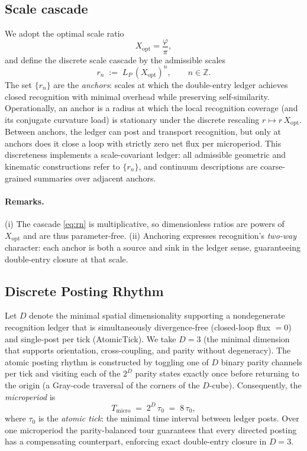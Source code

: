 \documentclass[11pt]{article}
\theoremstyle{definition}
\theoremstyle{remark}
\begin{document}
\subsection{Scale cascade}
We adopt the optimal scale ratio
\[
X_{\mathrm{opt}}=\frac{\varphi}{\pi},
\]
and define the discrete scale cascade by the admissible scales
\begin{equation}
\label{eq:rn}
r_n \;:=\; L_P\,(X_{\mathrm{opt}})^n,\qquad n\in\mathbb{Z}.
\end{equation}
The set $\{r_n\}$ are the \emph{anchors}: scales at which the double-entry ledger achieves closed recognition with minimal overhead while preserving self-similarity. Operationally, an anchor is a radius at which the local recognition coverage (and its conjugate curvature load) is stationary under the discrete rescaling $r\mapsto r\,X_{\mathrm{opt}}$. Between anchors, the ledger can post and transport recognition, but only at anchors does it close a loop with strictly zero net flux per microperiod. This discreteness implements a scale-covariant ledger: all admissible geometric and kinematic constructions refer to $\{r_n\}$, and continuum descriptions are coarse-grained summaries over adjacent anchors.

\paragraph{Remarks.}
(i) The cascade \eqref{eq:rn} is multiplicative, so dimensionless ratios are powers of $X_{\mathrm{opt}}$ and are thus parameter-free. (ii) Anchoring expresses recognition’s \emph{two-way} character: each anchor is both a source and sink in the ledger sense, guaranteeing double-entry closure at that scale.

\subsection{Discrete Posting Rhythm}
Let $D$ denote the minimal spatial dimensionality supporting a nondegenerate recognition ledger that is simultaneously divergence-free (closed-loop flux $=0$) and single-post per tick (AtomicTick). We take $D=3$ (the minimal dimension that supports orientation, cross-coupling, and parity without degeneracy). The atomic posting rhythm is constructed by toggling one of $D$ binary parity channels per tick and visiting each of the $2^D$ parity states exactly once before returning to the origin (a Gray-code traversal of the corners of the $D$-cube). Consequently, the \emph{microperiod} is
\begin{equation}
\label{eq:microperiod}
T_{\mathrm{micro}} \;=\; 2^D\,\tau_0 \;=\; 8\,\tau_0,
\end{equation}
where $\tau_0$ is the \emph{atomic tick}: the minimal time interval between ledger posts. Over one microperiod the parity-balanced tour guarantees that every directed posting has a compensating counterpart, enforcing exact double-entry closure in $D=3$.
\end{document}

